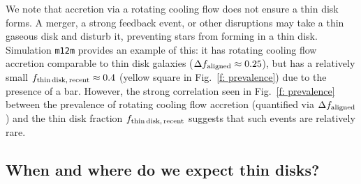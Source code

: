 \documentclass[fleqn,usenatbib]{mnras}
\newcommand{\fthin}{f_{\rm thin\,disk,\,recent}}
\begin{document}

We note that accretion via a rotating cooling flow does not ensure a thin disk forms. 
A merger, a strong feedback event, or other disruptions may take a thin gaseous disk and disturb it, preventing stars from forming in a thin disk.
Simulation \texttt{m12m} provides an example of this:
it has rotating cooling flow accretion comparable to thin disk galaxies ($\Delta f_{\rm aligned} \approx 0.25$), but has a relatively small $\fthin \approx 0.4$ (yellow square in Fig.~\ref{f: prevalence}) due to the presence of a bar.
However, the strong correlation seen in Fig.~\ref{f: prevalence} between the prevalence of rotating cooling flow accretion (quantified via $\Delta f_{\rm aligned}$) and the thin disk fraction $\fthin$ suggests that such events are relatively rare. 


\subsection{When and where do we expect thin disks?}
\end{document}
